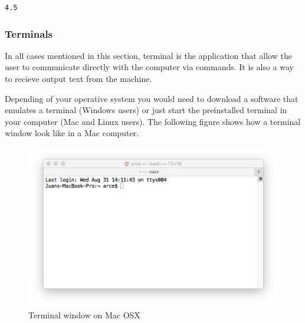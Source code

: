 \documentclass[11pt]{article}
\begin{document}
\begin{verbatim}
4.5
\end{verbatim}

\subsubsection{Terminals}
\label{sec-2-1-1}
In all cases mentioned in this section, terminal is the application that allow the user to communicate directly with the computer via commands. It is also a way to recieve output text from the machine.

Depending of your operative system you would need to download a software that emulates a terminal (Windows users) or just start the preinstalled terminal in your computer (Mac and Linux users). The following figure shows how a terminal window look like in a Mac computer.

\begin{figure}[htb]
\centering
\includegraphics[width=.9\linewidth]{./figures/terminal-mac.png}
\caption{Terminal window on Mac OSX}
\end{figure}
\end{document}

